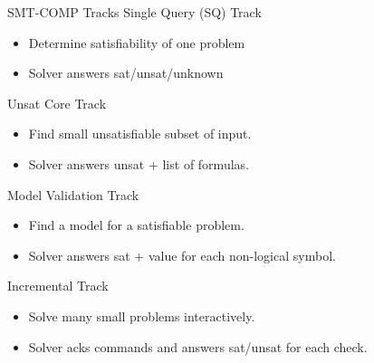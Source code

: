 \documentclass[table]{beamer}
\def\emph#1{\textcolor{MYblue}{#1}}
\begin{document}
\begin{frame}[fragile]{SMT-COMP Tracks}
  \emph{Single Query (SQ) Track}
  \begin{itemize}
  \item Determine satisfiability of one problem
  \item Solver answers sat/unsat/unknown
  \end{itemize}
  \medskip

  \emph{Unsat Core Track}
  \begin{itemize}
  \item Find small unsatisfiable subset of input.
  \item Solver answers unsat + list of formulas.
  \end{itemize}
  \medskip

  \emph{Model Validation Track}
  \begin{itemize}
  \item Find a model for a satisfiable problem.
  \item Solver answers sat + value for each non-logical symbol.
  \end{itemize}
  \medskip

  \emph{Incremental Track}
  \begin{itemize}
  \item Solve many small problems interactively.
  \item Solver acks commands and answers sat/unsat for each check.
  \end{itemize}
\end{frame}



\end{document}
